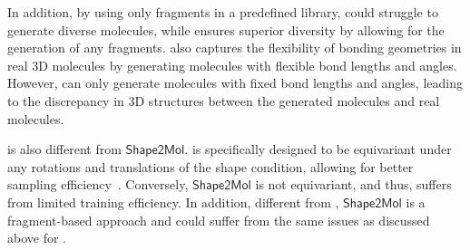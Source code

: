 %
%
%
%
%
%
In addition, by using only fragments in a predefined library, \squid could struggle to generate diverse molecules, 
while \method ensures superior diversity by allowing for the generation of any fragments.
%
%
%
%
\method also captures the flexibility of bonding geometries
in real 3D molecules by generating molecules with flexible bond lengths and angles.
%
However, \squid can only generate molecules with fixed bond lengths and angles, leading to the discrepancy in 3D structures between the %
generated molecules and real molecules. 

\method %
is also different from $\mathsf{Shape2Mol}$. 
%
\method is specifically designed to be equivariant under any rotations and translations of the shape condition, allowing for better sampling efficiency~\cite{Jonas20a}.
%
Conversely, $\mathsf{Shape2Mol}$ is not equivariant, and thus, suffers from limited training efficiency. %
%
In addition, different from \method, $\mathsf{Shape2Mol}$ is a fragment-based approach and could suffer from the same issues as discussed above for \squid. %
%

